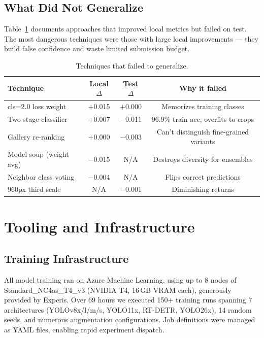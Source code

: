 \documentclass[11pt,a4paper]{article}
\begin{document}
\subsection{What Did Not Generalize}

Table~\ref{tab:negative} documents approaches that improved local metrics but failed on test.
The most dangerous techniques were those with large local improvements --- they build false confidence and waste limited submission budget.

\begin{table}[H]
\centering
\caption{Techniques that failed to generalize.}
\label{tab:negative}
\small
\begin{tabular}{@{}lccc@{}}
\toprule
\textbf{Technique} & \textbf{Local $\Delta$} & \textbf{Test $\Delta$} & \textbf{Why it failed} \\
\midrule
cls=2.0 loss weight          & $+$0.015 & $+$0.000 & Memorizes training classes \\
Two-stage classifier         & $+$0.007 & $-$0.011 & 96.9\% train acc, overfits to crops \\
Gallery re-ranking           & $+$0.000 & $-$0.003 & Can't distinguish fine-grained variants \\
Model soup (weight avg)      & $-$0.015 & N/A      & Destroys diversity for ensembles \\
Neighbor class voting        & $-$0.004 & N/A      & Flips correct predictions \\
960px third scale            & N/A      & $-$0.001 & Diminishing returns \\
\bottomrule
\end{tabular}
\end{table}

\section{Tooling and Infrastructure}
\label{sec:tooling}

\subsection{Training Infrastructure}

All model training ran on Azure Machine Learning, using up to 8 nodes of Standard\_NC4as\_T4\_v3 (NVIDIA T4, 16\,GB VRAM each), generously provided by Experis.
Over 69 hours we executed 150+ training runs spanning 7 architectures (YOLOv8x/l/m/s, YOLO11x, RT-DETR, YOLO26x), 14 random seeds, and numerous augmentation configurations.
Job definitions were managed as YAML files, enabling rapid experiment dispatch.
\end{document}
